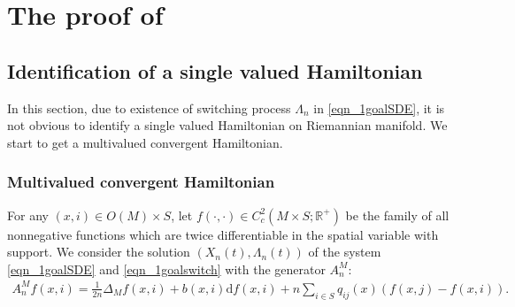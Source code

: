 \documentclass[a4paper]{article}
\numberwithin{equation}{section}
\theoremstyle{definition}
\begin{document}
\section{The proof of }\label{sec:the_proof_of_main_theorem}
\subsection{Identification of a single valued Hamiltonian}
In this section, due to existence of switching process $\Lambda_n$ in \eqref{eqn_1goalSDE}, it is not obvious to identify a single valued Hamiltonian on Riemannian manifold. We start to get a multivalued convergent Hamiltonian. 
\subsubsection{Multivalued convergent Hamiltonian}
For any $(x,i)\in O(M) \times S$, let $f(\cdot,\cdot)\in  C^2_c(M\times S;\mathbb{R}^+)$ be the family of all nonnegative functions which are twice differentiable in the spatial variable with support. We consider the solution  $(X_n(t),\Lambda_n(t))$ of the system \eqref{eqn_1goalSDE} and \eqref{eqn_1goalswitch} with the generator $A_n^M$:
\begin{align}\label{eqn_ANM}
   A_n^Mf(x,i)
   =\frac{1}{2n}\Delta_Mf(x,i)+b(x,i)\mathrm{d}f(x,i)+n\sum_{i\in S}q_{ij}(x)(f(x,j)-f(x,i)).
\end{align}
\end{document}
